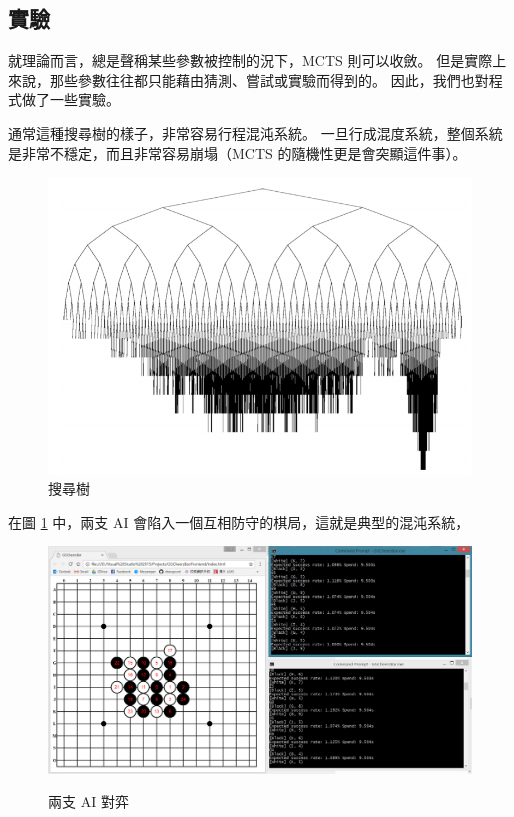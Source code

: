 \documentclass[12pt]{article}
\begin{document}
\begin{CJK}{UTF8}{bsmi}
\section{實驗}
就理論而言，總是聲稱某些參數被控制的況下，MCTS 則可以收斂。
但是實際上來說，那些參數往往都只能藉由猜測、嘗試或實驗而得到的。
因此，我們也對程式做了一些實驗。

通常這種搜尋樹的樣子，非常容易行程混沌系統。
一旦行成混度系統，整個系統是非常不穩定，而且非常容易崩塌（MCTS 的隨機性更是會突顯這件事）。
\begin{figure}[h]
  \caption{搜尋樹}
  \centering
  \includegraphics[width=1\textwidth]{search}
\end{figure}
在圖 \ref{two_ai} 中，兩支 AI 會陷入一個互相防守的棋局，這就是典型的混沌系統，
\begin{figure}[h]
  \caption{兩支 AI 對弈}
  \centering
  \includegraphics[width=1\textwidth]{chaos}
  \label{two_ai}
\end{figure}


\end{CJK}
\end{document}
